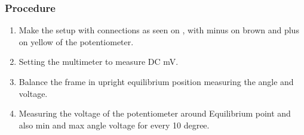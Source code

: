 \subsubsection{Procedure}
\begin{enumerate}
	\item Make the setup with connections as seen on , with minus on brown and plus on yellow of the potentiometer.
	\item Setting the multimeter to measure DC mV.
	\item Balance the frame in upright equilibrium position measuring the angle and voltage.
	\item Measuring  the voltage of the potentiometer around Equilibrium point and also min and max angle voltage for every 10 degree.
\end{enumerate}


